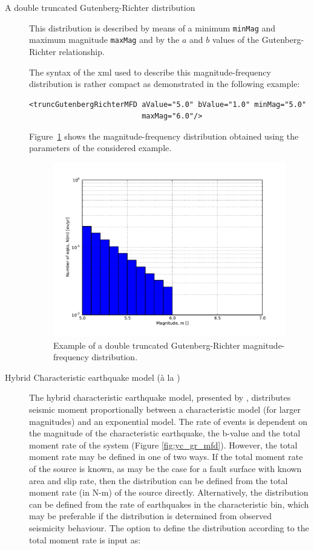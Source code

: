 \begin{description}
\item[A double truncated Gutenberg-Richter distribution]
This distribution is described by means of a minimum \texttt{minMag} and
maximum magnitude \texttt{maxMag} and by the $a$ and $b$ values of the
Gutenberg-Richter relationship.

The syntax of the xml used to describe this magnitude-frequency distribution
is rather compact as demonstrated in the following example:

\begin{verbatim}
<truncGutenbergRichterMFD aValue="5.0" bValue="1.0" minMag="5.0"
                          maxMag="6.0"/>
\end{verbatim}

Figure~\ref{fig:dt_gr_mfd} shows the magnitude-frequency distribution
obtained using the parameters of the considered example.

\begin{figure}[!ht]
\centering
\includegraphics[width=12cm]{figures/hazard/dt_mfd.pdf}
\caption{Example of a double truncated Gutenberg-Richter magnitude-frequency
distribution.}
\label{fig:dt_gr_mfd}
\end{figure}

\item[Hybrid Characteristic earthquake model (\`{a} la \cite{youngs1985})]
The hybrid characteristic earthquake model, presented by \cite{youngs1985},
distributes seismic moment proportionally between a characteristic model (for
larger magnitudes) and an exponential model. The rate of events is dependent
on the magnitude of the characteristic earthquake, the b-value and the total
moment rate of the system (Figure \ref{fig:yc_gr_mfd}). However, the total
moment rate may be defined in one of two ways. If the total moment rate of the
source is known, as may be the case for a fault surface with known area and
slip rate, then the distribution can be defined from the total moment rate (in
N-m) of the source directly. Alternatively, the distribution can be defined
from the rate of earthquakes in the characteristic bin, which may be
preferable if the distribution is determined from observed seismicity
behaviour. The option to define the distribution according to the total moment
rate is input as:



\end{description}
